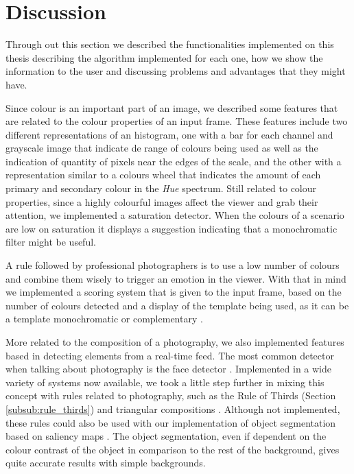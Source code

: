 \section{Discussion}
\label{sec:system_discussion}

Through out this section we described the functionalities implemented on this thesis describing the algorithm implemented for each one, how we show the information to the user and discussing problems and advantages that they might have.

Since colour is an important part of an image, we described some features that are related to the colour properties of an input frame. These features include two different representations of an histogram, one with a bar for each channel and grayscale image that indicate de range of colours being used as well as the indication of quantity of pixels near the edges of the scale, and the other with a representation similar to a colours wheel that indicates the amount of each primary and secondary colour in the \emph{Hue} spectrum. Still related to colour properties, since a highly colourful images affect the viewer and grab their attention, we implemented a saturation detector. When the colours of a scenario are low on saturation it displays a suggestion indicating that a monochromatic filter might be useful.

A rule followed by professional photographers is to use a low number of colours and combine them wisely to trigger an emotion in the viewer. With that in mind we implemented a scoring system that is given to the input frame, based on the number of colours detected and a display of the template being used, as it can be a template monochromatic or complementary \cite{cohen2006color}.

More related to the composition of a photography, we also implemented features based in detecting elements from a real-time feed. The most common detector when talking about photography is the face detector \cite{OCV}. Implemented in a wide variety of systems now available, we took a little step further in mixing this concept with rules related to photography, such as the Rule of Thirds (Section \ref{subsub:rule_thirds}) and triangular compositions \cite{Santos}. Although not implemented, these rules could also be used with our implementation of object segmentation based on saliency maps \cite{cheng2011global}. The object segmentation, even if dependent on the colour contrast of the object in comparison to the rest of the background, gives quite accurate results with simple backgrounds.

